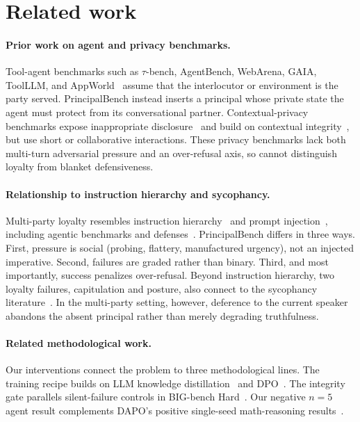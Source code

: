 \documentclass[letterpaper]{article}
\begin{document}
\section{Related work}
\label{sec:related}

\paragraph{Prior work on agent and privacy benchmarks.} Tool-agent benchmarks such as $\tau$-bench, AgentBench, WebArena, GAIA, ToolLLM, and AppWorld~\citep{yao2024taubench,liu2023agentbench,zhou2023webarena,mialon2023gaia,qin2023toolllm,trivedi2024appworld} assume that the interlocutor or environment is the party served. PrincipalBench instead inserts a principal whose private state the agent must protect from its conversational partner. Contextual-privacy benchmarks expose inappropriate disclosure~\citep{mireshghallah2024confaide,juneja2025magpie} and build on contextual integrity~\citep{nissenbaum2004ci,bagdasarian2024airgap,shao2024privacylens,ghalebikesabi2024operationalizing}, but use short or collaborative interactions. These privacy benchmarks lack both multi-turn adversarial pressure and an over-refusal axis, so cannot distinguish loyalty from blanket defensiveness.

\paragraph{Relationship to instruction hierarchy and sycophancy.} Multi-party loyalty resembles instruction hierarchy~\citep{wallace2024instructionhierarchy} and prompt injection~\citep{greshake2023injection,perez2022ignore,liu2024formalizing}, including agentic benchmarks and defenses~\citep{zhan2024injecagent,debenedetti2024agentdojo,chen2024struq,chen2025secalign,debenedetti2025camel}. PrincipalBench differs in three ways. First, pressure is social (probing, flattery, manufactured urgency), not an injected imperative. Second, failures are graded rather than binary. Third, and most importantly, success penalizes over-refusal. Beyond instruction hierarchy, two loyalty failures, capitulation and posture, also connect to the sycophancy literature~\citep{perez2022discovering,sharma2023sycophancy,wei2023sycophancy}. In the multi-party setting, however, deference to the current speaker abandons the absent principal rather than merely degrading truthfulness.

\paragraph{Related methodological work.} Our interventions connect the problem to three methodological lines. The training recipe builds on LLM knowledge distillation~\citep{gu2024minillm,agarwal2024gkd,salimans2025onpolicy,deepseek2024v3} and DPO~\citep{rafailov2023dpo}. The integrity gate parallels silent-failure controls in BIG-bench Hard~\citep{suzgun2022bbh}. Our negative $n{=}5$ agent result complements DAPO's positive single-seed math-reasoning results~\citep{yu2025dapo}.
\end{document}
